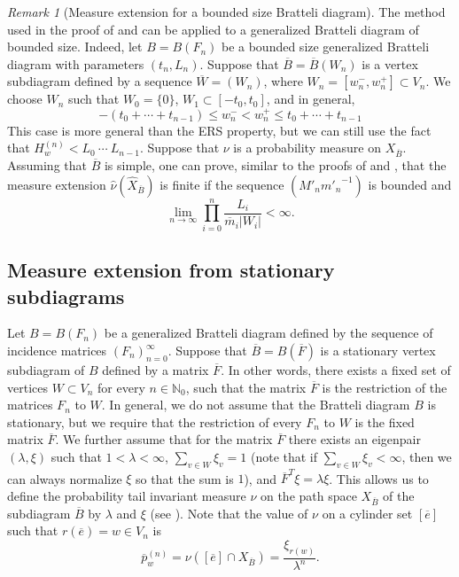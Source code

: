 \documentclass[11pt,reqno]{amsart}
\theoremstyle{definition}
\theoremstyle{remark}
\newtheorem{remark}[definition]{Remark}
\theoremstyle{plain}
\def\ol{\overline}
\def\ov{\overline}
\def\wh{\widehat}
\newcommand{\N}{\mathbb N}
\newcommand{\be}{\begin{equation}}
\newcommand{\ee}{\end{equation}}
\numberwithin{equation}{section}
\begin{document}
\begin{remark}[Measure extension for a bounded size Bratteli diagram]
The method used in the proof of  and  can be applied to 
a generalized Bratteli diagram of bounded size. Indeed, let $B= B(F_n)$ be a bounded size generalized Bratteli diagram with parameters $(t_n, L_n)$. Suppose that $\ol B= \ol B(W_n)$ is a vertex subdiagram defined by a sequence $\ol W = (W_n)$, where 
$W_n  = [w_n^-, w_n^+ ] \subset V_n$. We choose $W_n$ such that 
$W_0 = \{0\}$, $W_1 \subset [-t_0, t_0]$, and in general, 
$$
- (t_0 + \cdots + t_{n-1}) \leq w_n^- < w_n^+ \leq  t_0 + \cdots + t_{n-1}
$$ This case is more general than the ERS property, but we can still use the fact that $H_w^{(n)} < L_0\ \cdots\ L_{n-1}$. 
Suppose that $\nu$ is a probability measure on $X_{\ol B}$. Assuming that $\ol B$ is simple, one can prove, similar to the proofs of  and , that the measure extension $\wh\nu(\wh X_{\ol B})$ is finite if
the sequence $(M'_n {m'_n}^{-1})$ is bounded and 
$$
\lim_{n\to \infty} \prod_{i=0}^n \frac{L_i}{\ol m_i |W_i|} < \infty.
$$

\end{remark}

\subsection{Measure extension from stationary subdiagrams}
Let $B = B(F_n)$ be a generalized Bratteli diagram defined by the sequence of incidence matrices $(F_n)_{n=0}^{\infty}$. Suppose that $\ov B =  B(\ol F)$ is a stationary vertex subdiagram of $B$ defined by a matrix $\ov F$. In other words, there exists a fixed set of vertices $W \subset V_n$ for every $n \in \N_0$, such that the matrix $\ol F$ is the restriction of the matrices $F_n$ to $W$. In general, we do not assume that the Bratteli diagram $B$ is stationary, but we require that the restriction of every $F_n$ to $W$ is the fixed matrix $\ol F$. We further assume that for the matrix $\ov F$ there exists an eigenpair $(\lambda, \xi)$ such that $1 <\lambda < \infty$, $\sum_{v\in W} \xi_v =1$ (note that if $\sum_{v\in W} \xi_v < \infty$, then we can always normalize $\xi$ so that the sum is $1$), and $\ol F^T\xi = \lambda \xi$.
This allows us to define the probability tail invariant measure 
$\nu$ on the path space $X_{\ov B}$ of the subdiagram $\ov B$ by  
$\lambda$ and $\xi$ (see 
). Note that the value of $\nu$ on a cylinder set $[\ov e]$ such that $r(\ol e)= w \in V_n$ is 
\be\label{eq s4 Perron measure}
\ov p_w^{(n)} = \nu([\ov e] \cap X_{\ov B}) = 
\frac{\xi_{r(w)}}{ \lambda^n}.
\ee
\end{document}
